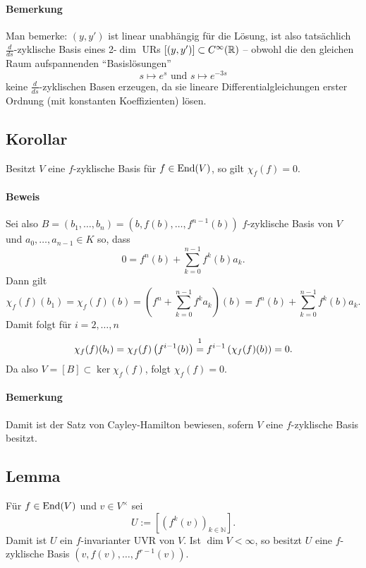 \paragraph{Bemerkung}
	Man bemerke: $ (y,y') $ ist linear unabhängig für die Lösung, ist also tatsächlich $ \frac{d}{ds} $-zyklische Basis eines 2-$ \dim $ URs $ [(y,y')]\subset C^\infty(\mathbb{R}) $ -- obwohl die den gleichen Raum aufspannenden "`Basislösungen"'
		\[ s\mapsto e^s \text{ und } s\mapsto e^{-3s} \]
	keine $ \frac{d}{ds} $-zyklischen Basen erzeugen, da sie lineare Differentialgleichungen erster Ordnung (mit konstanten Koeffizienten) lösen.
	
\subsection{Korollar}
\begin{Korollar}
	Besitzt $ V $ eine $ f $-zyklische Basis für $ f\in\operatorname{End}(V) $, so gilt $ \chi_f(f)=0 $.
\end{Korollar}
\paragraph{Beweis}
	Sei also $ B=(b_1,\dots,b_n) =(b,f(b),\dots,f^{n-1}(b)) $ $ f $-zyklische Basis von $ V $ und $ a_0,\dots,a_{n-1}\in K $ so, dass
		\[ 0 = f^n(b)+\sum_{k=0}^{n-1}f^k(b)a_k. \]
	Dann gilt
		\[ \chi_f(f)(b_1) = \chi_f(f)(b) = \left(f^n+\sum_{k=0}^{n-1}f^ka_k\right)(b) = f^n(b)+\sum_{k=0}^{n-1}f^k(b)a_k. \]
	Damit folgt für $ i=2,\dots,n $
		\[ \chi_f(f)(b_i) = \chi_f(f)\left(f^{i-1}(b)\right) \stackrel{\footnotemark}{=} f^{i-1}\left(\chi_f(f)(b) \right) = 0. \]
	Da also $ V=[B] \subset \ker {\chi_f(f)}$, folgt $ \chi_f(f) = 0. $
\paragraph{Bemerkung}
	Damit ist der Satz von Cayley-Hamilton bewiesen, sofern $ V $ eine $ f $-zyklische Basis besitzt.
	
\subsection{Lemma}
\begin{Lemma}
	Für $ f\in\operatorname{End}(V) $ und $ v\in V^\times  $ sei
		\[ U := \left[\left(f^k(v)\right)_{k\in{\mathbb{N}}}\right]. \]
	Damit ist $ U $ ein $ f $-invarianter UVR von $ V $. Ist $ \dim V < \infty $, so besitzt $ U $ eine $ f $-zyklische Basis $ \left(v,f(v),\dots,f^{r-1}(v)\right) $.
\end{Lemma}
